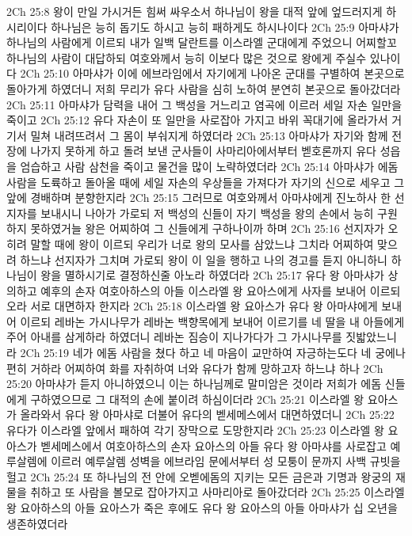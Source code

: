 2Ch 25:8  왕이 만일 가시거든 힘써 싸우소서 하나님이 왕을 대적 앞에 엎드러지게 하시리이다 하나님은 능히 돕기도 하시고 능히 패하게도 하시나이다
2Ch 25:9  아마샤가 하나님의 사람에게 이르되 내가 일백 달란트를 이스라엘 군대에게 주었으니 어찌할꼬 하나님의 사람이 대답하되 여호와께서 능히 이보다 많은 것으로 왕에게 주실수 있나이다
2Ch 25:10  아마샤가 이에 에브라임에서 자기에게 나아온 군대를 구별하여 본곳으로 돌아가게 하였더니 저희 무리가 유다 사람을 심히 노하여 분연히 본곳으로 돌아갔더라
2Ch 25:11  아마샤가 담력을 내어 그 백성을 거느리고 염곡에 이르러 세일 자손 일만을 죽이고
2Ch 25:12  유다 자손이 또 일만을 사로잡아 가지고 바위 꼭대기에 올라가서 거기서 밀쳐 내려뜨려서 그 몸이 부숴지게 하였더라
2Ch 25:13  아마샤가 자기와 함께 전장에 나가지 못하게 하고 돌려 보낸 군사들이 사마리아에서부터 벧호론까지 유다 성읍을 엄습하고 사람 삼천을 죽이고 물건을 많이 노략하였더라
2Ch 25:14  아마샤가 에돔 사람을 도륙하고 돌아올 때에 세일 자손의 우상들을 가져다가 자기의 신으로 세우고 그 앞에 경배하며 분향한지라
2Ch 25:15  그러므로 여호와께서 아마샤에게 진노하사 한 선지자를 보내시니 나아가 가로되 저 백성의 신들이 자기 백성을 왕의 손에서 능히 구원하지 못하였거늘 왕은 어찌하여 그 신들에게 구하나이까 하며
2Ch 25:16  선지자가 오히려 말할 때에 왕이 이르되 우리가 너로 왕의 모사를 삼았느냐 그치라 어찌하여 맞으려 하느냐 선지자가 그치며 가로되 왕이 이 일을 행하고 나의 경고를 듣지 아니하니 하나님이 왕을 멸하시기로 결정하신줄 아노라 하였더라
2Ch 25:17  유다 왕 아마샤가 상의하고 예후의 손자 여호아하스의 아들 이스라엘 왕 요아스에게 사자를 보내어 이르되 오라 서로 대면하자 한지라
2Ch 25:18  이스라엘 왕 요아스가 유다 왕 아마샤에게 보내어 이르되 레바논 가시나무가 레바논 백향목에게 보내어 이르기를 네 딸을 내 아들에게 주어 아내를 삼게하라 하였더니 레바논 짐승이 지나가다가 그 가시나무를 짓밟았느니라
2Ch 25:19  네가 에돔 사람을 쳤다 하고 네 마음이 교만하여 자긍하는도다 네 궁에나 편히 거하라 어찌하여 화를 자취하여 너와 유다가 함께 망하고자 하느냐 하나
2Ch 25:20  아마샤가 듣지 아니하였으니 이는 하나님께로 말미암은 것이라 저희가 에돔 신들에게 구하였으므로 그 대적의 손에 붙이려 하심이더라
2Ch 25:21  이스라엘 왕 요아스가 올라와서 유다 왕 아마샤로 더불어 유다의 벧세메스에서 대면하였더니
2Ch 25:22  유다가 이스라엘 앞에서 패하여 각기 장막으로 도망한지라
2Ch 25:23  이스라엘 왕 요아스가 벧세메스에서 여호아하스의 손자 요아스의 아들 유다 왕 아마샤를 사로잡고 예루살렘에 이르러 예루살렘 성벽을 에브라임 문에서부터 성 모퉁이 문까지 사백 규빗을 헐고
2Ch 25:24  또 하나님의 전 안에 오벧에돔의 지키는 모든 금은과 기명과 왕궁의 재물을 취하고 또 사람을 볼모로 잡아가지고 사마리아로 돌아갔더라
2Ch 25:25  이스라엘 왕 요아하스의 아들 요아스가 죽은 후에도 유다 왕 요아스의 아들 아마샤가 십 오년을 생존하였더라

